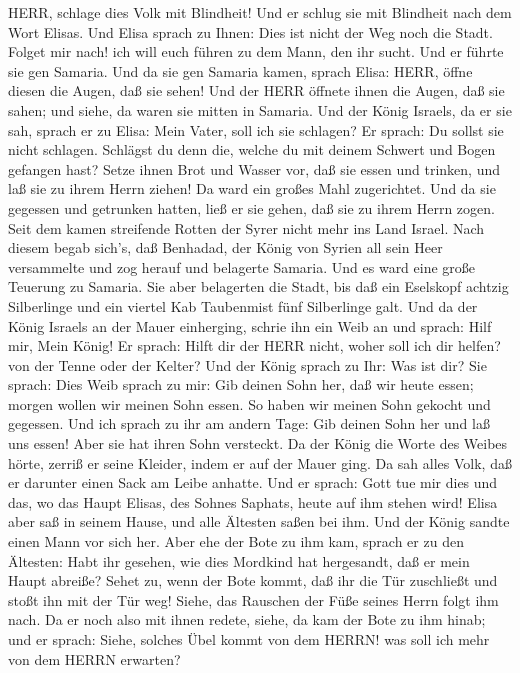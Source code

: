 HERR, schlage dies Volk mit Blindheit! Und er schlug sie mit Blindheit
nach dem Wort Elisas.  Und Elisa sprach zu Ihnen: Dies ist
nicht der Weg noch die Stadt. Folget mir nach! ich will euch führen zu
dem Mann, den ihr sucht. Und er führte sie gen Samaria. 
Und da sie gen Samaria kamen, sprach Elisa: HERR, öffne diesen die
Augen, daß sie sehen! Und der HERR öffnete ihnen die Augen, daß sie
sahen; und siehe, da waren sie mitten in Samaria.  Und der
König Israels, da er sie sah, sprach er zu Elisa: Mein Vater, soll ich
sie schlagen?  Er sprach: Du sollst sie nicht schlagen.
Schlägst du denn die, welche du mit deinem Schwert und Bogen gefangen
hast? Setze ihnen Brot und Wasser vor, daß sie essen und trinken, und
laß sie zu ihrem Herrn ziehen!  Da ward ein großes Mahl
zugerichtet. Und da sie gegessen und getrunken hatten, ließ er sie
gehen, daß sie zu ihrem Herrn zogen. Seit dem kamen streifende Rotten
der Syrer nicht mehr ins Land Israel.  Nach diesem begab
sich's, daß Benhadad, der König von Syrien all sein Heer versammelte und
zog herauf und belagerte Samaria.  Und es ward eine große
Teuerung zu Samaria. Sie aber belagerten die Stadt, bis daß ein
Eselskopf achtzig Silberlinge und ein viertel Kab Taubenmist fünf
Silberlinge galt.  Und da der König Israels an der Mauer
einherging, schrie ihn ein Weib an und sprach: Hilf mir, Mein König!
 Er sprach: Hilft dir der HERR nicht, woher soll ich dir
helfen? von der Tenne oder der Kelter?  Und der König
sprach zu Ihr: Was ist dir? Sie sprach: Dies Weib sprach zu mir: Gib
deinen Sohn her, daß wir heute essen; morgen wollen wir meinen Sohn
essen.  So haben wir meinen Sohn gekocht und gegessen. Und
ich sprach zu ihr am andern Tage: Gib deinen Sohn her und laß uns essen!
Aber sie hat ihren Sohn versteckt.  Da der König die Worte
des Weibes hörte, zerriß er seine Kleider, indem er auf der Mauer ging.
Da sah alles Volk, daß er darunter einen Sack am Leibe anhatte.
 Und er sprach: Gott tue mir dies und das, wo das Haupt
Elisas, des Sohnes Saphats, heute auf ihm stehen wird! 
Elisa aber saß in seinem Hause, und alle Ältesten saßen bei ihm. Und der
König sandte einen Mann vor sich her. Aber ehe der Bote zu ihm kam,
sprach er zu den Ältesten: Habt ihr gesehen, wie dies Mordkind hat
hergesandt, daß er mein Haupt abreiße? Sehet zu, wenn der Bote kommt,
daß ihr die Tür zuschließt und stoßt ihn mit der Tür weg! Siehe, das
Rauschen der Füße seines Herrn folgt ihm nach.  Da er noch
also mit ihnen redete, siehe, da kam der Bote zu ihm hinab; und er
sprach: Siehe, solches Übel kommt von dem HERRN! was soll ich mehr von
dem HERRN erwarten?

